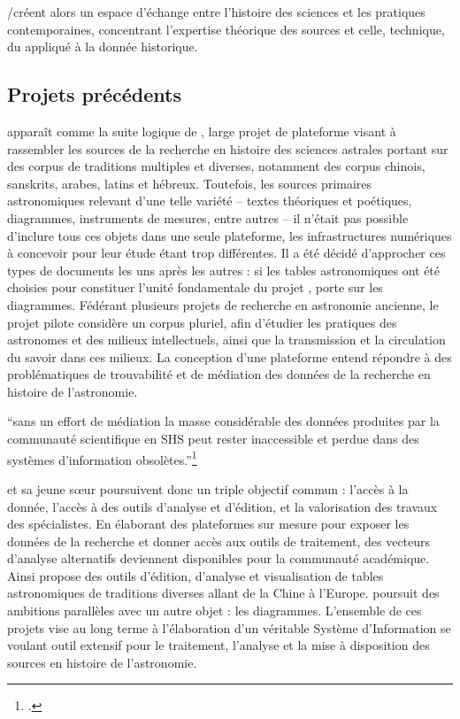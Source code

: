 \eida/\vhs créent alors un espace d'échange entre l'histoire des sciences
et les pratiques contemporaines, concentrant l'expertise théorique des
sources et celle, technique, du \dl appliqué à la donnée
historique.

\hypertarget{projets-precedents}{%
\subsection{Projets précédents}\label{projets-precedents}}

\eida apparaît comme la suite logique de \dishas, large projet de
plateforme visant à rassembler les sources de la recherche en histoire
des sciences astrales portant sur des corpus de traditions multiples et
diverses, notamment des corpus chinois, sanskrits, arabes, latins et
hébreux. Toutefois, les sources primaires astronomiques relevant d'une
telle variété -- textes théoriques et poétiques, diagrammes, instruments
de mesures, entre autres -- il n'était pas possible d'inclure tous ces
objets dans une seule plateforme, les infrastructures numériques à
concevoir pour leur étude étant trop différentes. Il a été décidé
d'approcher ces types de documents les uns après les autres : si les
tables astronomiques ont été choisies pour constituer l'unité
fondamentale du projet \dishas, \eida porte sur les diagrammes. Fédérant
plusieurs projets de recherche en astronomie ancienne, le projet pilote
\dishas considère un corpus pluriel, afin d'étudier les pratiques des
astronomes et des milieux intellectuels, ainsi que la transmission et la
circulation du savoir dans ces milieux. La conception d'une plateforme
entend répondre à des problématiques de trouvabilité et de médiation des
données de la recherche en histoire de l'astronomie.

\begin{kwote}
``sans un effort de médiation la masse considérable des données
produites par la communauté scientifique en SHS peut rester inaccessible
et perdue dans des systèmes d'information obsolètes.''\footcite[p.xix]{albouy_mediation_2019}
\end{kwote}       

\dishas et sa jeune sœur \eida poursuivent donc un triple objectif commun
: l'accès à la donnée, l'accès à des outils d'analyse et d'édition, et
la valorisation des travaux des spécialistes. En élaborant des
plateformes sur mesure pour exposer les données de la recherche et
donner accès aux outils de traitement, des vecteurs d'analyse
alternatifs deviennent disponibles pour la communauté académique. Ainsi
\dishas propose des outils d'édition, d'analyse et visualisation de
tables astronomiques de traditions diverses allant de la Chine à
l'Europe. \eida poursuit des ambitions parallèles avec un autre objet :
les diagrammes. L'ensemble de ces projets vise au long terme à
l'élaboration d'un véritable Système d'Information se voulant outil
extensif pour le traitement, l'analyse et la mise à disposition des
sources en histoire de l'astronomie.

